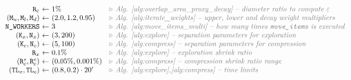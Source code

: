 \begin{table}[htbp]
\newcommand{\parcomment}[1]{\textcolor{gray}{\triangleright \textit{ #1}}}
\[
    \begin{array}{r @{\ } c @{\ } l @{\quad} l}
        \texttt{R}_\varepsilon & \gets & 1\% & \parcomment{Alg. \ref{alg:overlap_area_proxy_decay} -- diameter ratio to compute \(\varepsilon\)} \\
        (\texttt{M}_u, \texttt{M}_l, \texttt{M}_d) & \gets & (2.0, 1.2, 0.95) & \parcomment{Alg. \ref{alg:iterate_weights} -- upper, lower and decay weight multipliers} \\
        \texttt{N\_WORKERS} & \gets & 3 & \parcomment{Alg. \ref{alg:move_items_multi} -- how many times \texttt{move\_items} is executed} \\
        (\texttt{K}_x, \texttt{N}_x) & \gets & (3, 200) & \parcomment{Alg. \ref{alg:explore} -- separation parameters for exploration} \\
        (\texttt{K}_c, \texttt{N}_c) & \gets & (5, 100) & \parcomment{Alg. \ref{alg:compress} -- separation parameters for compression} \\
        \texttt{R}_x & \gets & 0.1\% & \parcomment{Alg. \ref{alg:explore} -- exploration shrink ratio} \\
        (\texttt{R}_c^s, \texttt{R}_c^e) & \gets & (0.05\%, 0.001\%) & \parcomment{Alg. \ref{alg:compress} -- compression shrink ratio range} \\
        (\texttt{TL}_x, \texttt{TL}_c) & \gets & (0.8, 0.2) \cdot 20' & \parcomment{Alg. \ref{alg:explore},\ref{alg:compress} -- time limits} \\
    \end{array}
\]
\caption{Configuration of \texttt{sparrow}'s parameters throughout the experiments.
The right column contains the relevant algorithm(s) and a short description for every entry.}
\label{tab:params}
\end{table}
